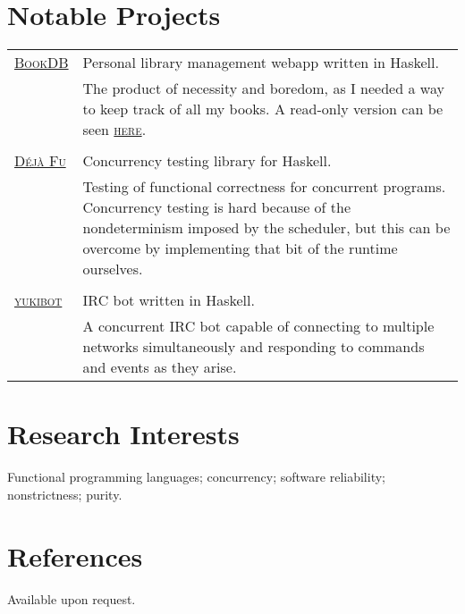 \documentclass[a4paper,10pt]{article}
\newcommand{\schref}[2]{\href{#1}{\textsc{#2}}}
\newenvironment{cvtable}{\begin{tabular}{x{2cm}|p{11.6cm}}}{\end{tabular}}
\newcommand{\when}[1]{\heading{#1}}
\newcommand{\heading}[1]{\textsc{#1} &}
\newcommand{\detail}[1]{& \footnotesize{#1}}
\begin{document}

\section{Notable Projects}
\begin{cvtable}
  \heading{\schref{https://github.com/barrucadu/bookdb}{BookDB}}
  Personal library management webapp written in Haskell.\\
  \detail{The product of necessity and boredom, as I needed a way to
    keep track of all my books. A read-only version can be seen
    \schref{http://www.barrucadu.co.uk/bookdb/}{here}.}\\\\

  \heading{\schref{https://github.com/barrucadu/dejafu}{D\'{e}j\`{a} Fu}}
  Concurrency testing library for Haskell.\\
  \detail{Testing of functional correctness for concurrent
    programs. Concurrency testing is hard because of the
    nondeterminism imposed by the scheduler, but this can be overcome
    by implementing that bit of the runtime ourselves.}\\\\

  \heading{\schref{https://github.com/barrucadu/yukibot}{yukibot}}
  IRC bot written in Haskell.\\
  \detail{A concurrent IRC bot capable of connecting to multiple
    networks simultaneously and responding to commands and events as
    they arise.}
\end{cvtable}

\section{Research Interests}
Functional programming languages; concurrency; software reliability;
nonstrictness; purity.

\section{References}
Available upon request.
\end{document}
